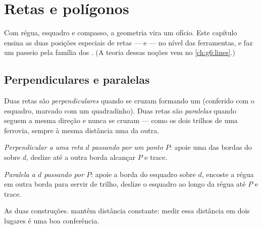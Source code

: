 \chapter{Retas e polígonos}\label{ch:g4:geometry}

Com régua, esquadro e compasso, a geometria vira um ofício. Este
capítulo ensina as duas posições especiais de retas ---
 e  --- no nível das ferramentas, e faz um
passeio pela família dos . (A teoria dessas noções vem no
\cref{ch:g6:lines}.)

\section{Perpendiculares e paralelas}

\begin{definition}\label{def:g4:geometry:def}
Duas retas são \emph{perpendiculares}
quando se cruzam formando um  (conferido com o esquadro,
marcado com um quadradinho). Duas retas são
\emph{paralelas} quando seguem a mesma direção
e nunca se cruzam --- como os dois trilhos de uma ferrovia, sempre à
mesma distância uma da outra.
\end{definition}

\begin{method}\label{met:g4:geometry:draw}
\emph{Perpendicular a uma reta $d$ passando por um ponto $P$}: apoie
uma das bordas do  sobre $d$, deslize até a outra borda
alcançar $P$ e trace.

\emph{Paralela a $d$ passando por $P$}: apoie a borda do esquadro
sobre $d$, encoste a régua em outra borda para servir de trilho,
deslize o esquadro ao longo da régua até $P$ e trace.
\end{method}

\begin{omfigure}

{\small As duas construções.  mantêm distância
constante: medir essa distância em dois lugares é uma boa
conferência.}
\end{omfigure}

